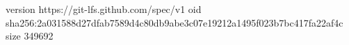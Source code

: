 version https://git-lfs.github.com/spec/v1
oid sha256:2a031588d27dfab7589d4c80db9abe3c07e19212a1495f023b7bc417fa22af4c
size 349692
